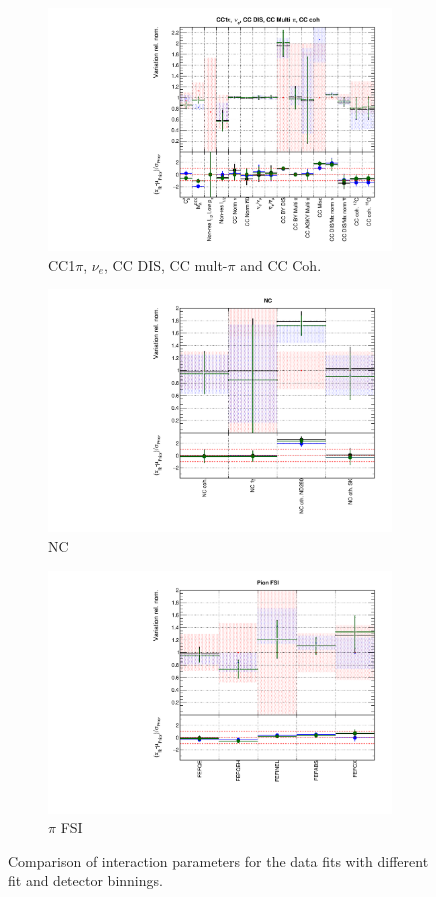 \begin{figure}
\begin{subfigure}{0.49\textwidth}
  \centering
  \includegraphics[width=0.9\linewidth]{figs/polydataxsec_3}
  \caption{CC1$\pi$, $\nu_e$, CC DIS, CC mult-$\pi$ and CC Coh.}
\end{subfigure}
\begin{subfigure}{0.49\textwidth}
  \centering
  \includegraphics[width=0.9\linewidth]{figs/polydataxsec_4}
  \caption{NC}
\end{subfigure}
\begin{subfigure}{0.49\textwidth}
  \centering
  \includegraphics[width=0.9\linewidth]{figs/polydataxsec_5}
  \caption{$\pi$ FSI}
\end{subfigure}
\caption{Comparison of interaction parameters for the data fits with different fit and detector binnings.}
\label{fig:polydataxsec}
\end{figure}


